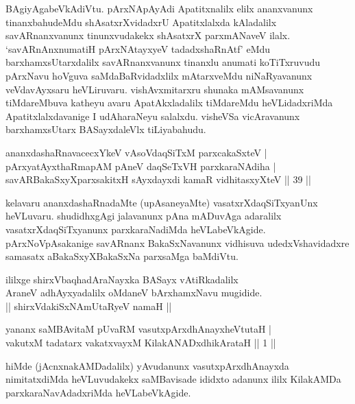 {BAgiyAgabeVkAdiVtu. pArxNApAyAdi Apatitxnalilx elilx ananxvanunx tinanxbahudeMdu shAsatxrXvidadxrU Apatitxlalxda kAladalilx savARnanxvanunx tinunxvudakekx shAsatxrX parxmANaveV ilalx. `savARnAnxnumatiH pArxNAtayxyeV tadadxshaRnAtf' eMdu barxhamxsUtarxdalilx savARnanxvanunx tinanxlu anumati koTiTxruvudu pArxNavu hoVguva saMdaBaRvidadxlilx mAtarxveMdu niNaRyavanunx veVdavAyxsaru heVLiruvaru. vishAvxmitarxru shunaka mAMsavanunx tiMdareMbuva katheyu avaru ApatAkxladalilx tiMdareMdu heVLidadxriMda Apatitxlalxdavanige I udAharaNeyu salalxdu. visheVSa vicAravanunx barxhamxsUtarx BASayxdaleVlx tiLiyabahudu.}
\begin{shl}
\footnotemark[1]ananxdashaRnavacecxYkeV vAsoVdaqSiTxM parxcakaSxteV | \\
pArxyatAyxthaRmapAM pAneV daqSeTxVH parxkaraNAdiha | \\
savARBakaSxyXparxsakitxH sAyxdayxdi kamaR vidhitasxyXteV \hfill|| 39 || 
\end{shl}

\begin{artha}
kelavaru ananxdashaRnadaMte (upAsaneyaMte) vasatxrXdaqSiTxyanUnx 
heVLuvaru. shudidhxgAgi jalavanunx pAna mADuvAga adaralilx 
vasatxrXdaqSiTxyanunx parxkaraNadiMda heVLabeVkAgide. 
pArxNoVpAsakanige savARnanx BakaSxNavanunx vidhisuva udedxVshavidadxre 
samasatx aBakaSxyXBakaSxNa parxsaMga baMdiVtu.
\end{artha}

\begin{center}
ililxge shirxVbaqhadAraNayxka BASayx vAtiRkadalilx\\
AraneV adhAyxyadalilx oMdaneV bArxhamxNavu mugidide.\\
|| shirxVdakiSxNAmUtaRyeV namaH ||
\end{center}


\centerline{}


\begin{shl}
yananx saMBAvitaM pUvaRM vasutxpArxdhAnayxheVtutaH | \\
vakutxM tadatarx vakatxvayxM KilakANADxdhikArataH \hfill|| 1 || 
\end{shl}

\begin{artha}
hiMde (jAcnxnakAMDadalilx) yAvudanunx vasutxpArxdhAnayxda 
nimitatxdiMda heVLu\-vudakekx saMBavisade ididxto adanunx ililx 
KilakAMDa parxkaraNavAdadxriMda heVLabeVkAgide.
\end{artha}

